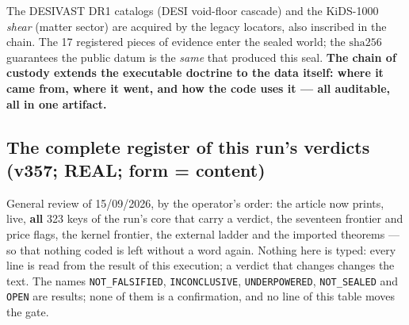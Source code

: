 \documentclass[11pt]{article}
\theoremstyle{definition}\newtheorem{deriv}{Derivation}
\begin{document}
The DESIVAST DR1 catalogs (DESI void-floor cascade) and the KiDS-1000 \emph{shear} (matter sector) are acquired by the legacy locators, also inscribed in the chain. The 17 registered pieces of evidence enter the sealed world; the $\mathrm{sha}256$ guarantees the public datum is the \emph{same} that produced this seal. \textbf{The chain of custody extends the executable doctrine to the data itself: where it came from, where it went, and how the code uses it --- all auditable, all in one artifact.}

\subsection*{The complete register of this run's verdicts (v357; REAL; form = content)}

General review of 15/09/2026, by the operator's order: the article now prints, live, \textbf{all} 323 keys of the run's core that carry a verdict, the seventeen frontier and price flags, the kernel frontier, the external ladder and the imported theorems --- so that nothing coded is left without a word again. Nothing here is typed: every line is read from the result of this execution; a verdict that changes changes the text. The names \texttt{NOT\_FALSIFIED}, \texttt{INCONCLUSIVE}, \texttt{UNDERPOWERED}, \texttt{NOT\_SEALED} and \texttt{OPEN} are results; none of them is a confirmation, and no line of this table moves the gate.
\end{document}
